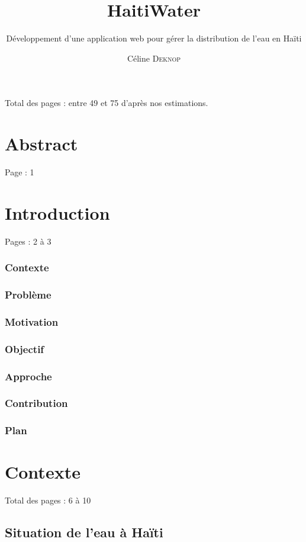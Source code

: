 \documentclass{eplmastersthesis_FR}
\title{HaitiWater}
\subtitle{Développement d'une application web pour gérer la distribution de l'eau en Haïti}
\author{Céline \textsc{Deknop}}
\begin{document}
	\maketitle
	\thispagestyle{empty}

	Total des pages : entre 49 et 75 d'après nos estimations.

	\chapter*{Abstract}

		Page : 1

	\chapter{Introduction}

		Pages : 2 à 3

		\subsection*{Contexte}
		\subsection*{Problème}
		\subsection*{Motivation}
		\subsection*{Objectif}
		\subsection*{Approche}
		\subsection*{Contribution}
		\subsection*{Plan}

	\chapter{Contexte}

		Total des pages : 6 à 10

		\section{Situation de l'eau à Haïti}
\end{document}
